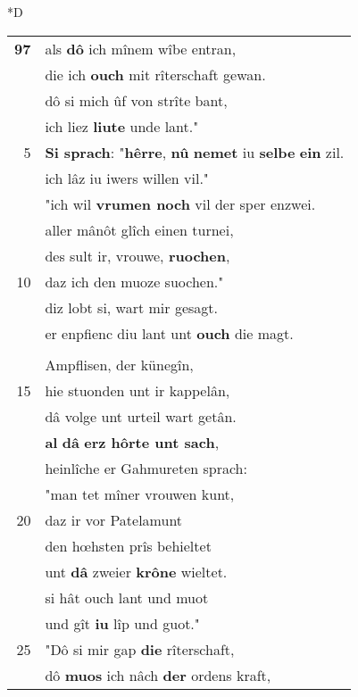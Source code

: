 \documentclass[8pt,a4paper,notitlepage]{article}
\begin{document}
\begin{table}[ht]
\begin{minipage}[t]{0.5\linewidth}
\small
\begin{center}*D
\end{center}
\begin{tabular}{rl}
\textbf{97} & als \textbf{dô} ich mînem wîbe entran,\\ 
 & die ich \textbf{ouch} mit rîterschaft gewan.\\ 
 & dô si mich ûf von strîte bant,\\ 
 & ich liez \textbf{liute} unde lant."\\ 
5 & \textbf{Si sprach}: "\textbf{hêrre}, \textbf{nû} \textbf{nemet} iu \textbf{selbe} \textbf{ein} zil.\\ 
 & ich lâz iu iwers willen vil."\\ 
 & "ich wil \textbf{vrumen noch} vil der sper enzwei.\\ 
 & aller mânôt glîch einen turnei,\\ 
 & des sult ir, vrouwe, \textbf{ruochen},\\ 
10 & daz ich den muoze suochen."\\ 
 & diz lobt si, wart mir gesagt.\\ 
 & er enpfienc diu lant unt \textbf{ouch} die magt.\\ 
 & \textit{\begin{large}D\end{large}}isiu driu junchêrrelîn\\ 
 & Ampflisen, der künegîn,\\ 
15 & hie stuonden unt ir kappelân,\\ 
 & dâ volge unt urteil wart getân.\\ 
 & \textbf{al} \textbf{dâ} \textbf{erz hôrte unt sach},\\ 
 & heinlîche er Gahmureten sprach:\\ 
 & "man tet mîner vrouwen kunt,\\ 
20 & daz ir vor Patelamunt\\ 
 & den hœhsten prîs behieltet\\ 
 & unt \textbf{dâ} zweier \textbf{krône} wieltet.\\ 
 & si hât ouch lant und muot\\ 
 & und gît \textbf{iu} lîp und guot."\\ 
25 & "Dô si mir gap \textbf{die} rîterschaft,\\ 
 & dô \textbf{muos} ich nâch \textbf{der} ordens kraft,\\ 

\end{tabular}
\end{minipage}
\end{table}
\end{document}
